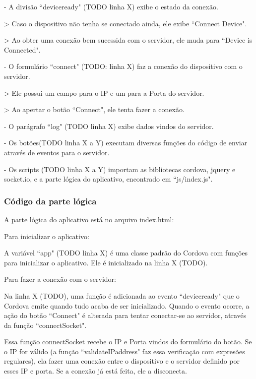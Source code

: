 \documentclass[a4paper,12pt]{article}
\begin{document}

- A divisão “deviceready" (TODO linha X) exibe o estado da conexão.

> Caso o dispositivo não tenha se conectado ainda, ele exibe “Connect Device".

> Ao obter uma conexão bem sucessida com o servidor, ele muda para “Device is Connected".


- O formulário “connect" (TODO: linha X) faz a conexão do dispositivo com o servidor.

> Ele possui um campo para o IP e um para a Porta do servidor.

> Ao apertar o botão “Connect", ele tenta fazer a conexão.


- O parágrafo “log" (TODO linha X) exibe dados vindos do servidor.

- Os botões(TODO linha X a Y) executam diversas funções do código de enviar através de eventos para o servidor.

- Os scripts (TODO linha X a Y) importam as bibliotecas cordova, jquery e socket.io, e a parte lógica do aplicativo, encontrado em “js/index.js".


\subsubsection{Código da parte lógica}

A parte lógica do aplicativo está no arquivo index.html:



Para inicializar o aplicativo:

A variável “app" (TODO linha X) é uma classe padrão do Cordova com funções para inicializar o aplicativo. Ele é inicializado na linha X (TODO).


Para fazer a conexão com o servidor:

Na linha X (TODO), uma função é adicionada ao evento “deviceready" que o Cordova emite quando tudo acaba de ser inicializado. Quando o evento ocorre, a ação do botão “Connect" é alterada para tentar conectar-se ao servidor, através da função “connectSocket".

Essa função connectSocket recebe o IP e Porta vindos do formulário do botão. Se o IP for válido (a função “validateIPaddress" faz essa verificação com expresões regulares), ela fazer uma conexão entre o dispositivo e o servidor definido por esses IP e porta. Se a conexão já está feita, ele a disconecta.
\end{document}
